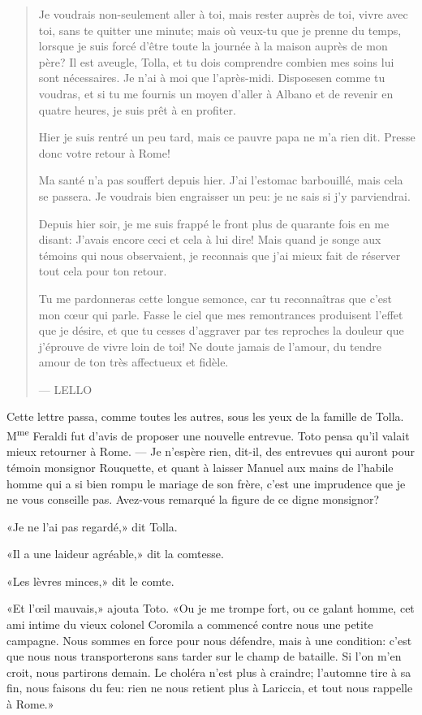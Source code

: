 \begin{quote}
Je voudrais non-seulement aller à toi, mais rester auprès de toi, vivre
avec toi, sans te quitter une minute; mais où veux-tu que je prenne du
temps, lorsque je suis forcé d'être toute la journée à la maison auprès
de mon père? Il est aveugle, Tolla, et tu dois comprendre combien mes
soins lui sont nécessaires. Je n'ai à moi que l'après-midi. Disposesen
comme tu voudras, et si tu me fournis un moyen d'aller à Albano et de
revenir en quatre heures, je suis prêt à en profiter.

Hier je suis rentré un peu tard, mais ce pauvre papa ne m'a rien dit.
Presse donc votre retour à Rome!

Ma santé n'a pas souffert depuis hier. J'ai l'estomac barbouillé, mais
cela se passera. Je voudrais bien engraisser un peu: je ne sais si j'y
parviendrai.

Depuis hier soir, je me suis frappé le front plus de quarante fois en me
disant: J'avais encore ceci et cela à lui dire! Mais quand je songe aux
témoins qui nous observaient, je reconnais que j'ai mieux fait de
réserver tout cela pour ton retour.

Tu me pardonneras cette longue semonce, car tu reconnaîtras que c'est
mon cœur qui parle. Fasse le ciel que mes remontrances produisent
l'effet que je désire, et que tu cesses d'aggraver par tes reproches la
douleur que j'éprouve de vivre loin de toi! Ne doute jamais de l'amour,
du tendre amour de ton très affectueux et fidèle.

--- LELLO
\end{quote}

Cette lettre passa, comme toutes les autres, sous les yeux de la famille
de Tolla. M\textsuperscript{me} Feraldi fut d'avis de proposer une
nouvelle entrevue. Toto pensa qu'il valait mieux retourner à Rome. ---
Je n'espère rien, dit-il, des entrevues qui auront pour témoin monsignor
Rouquette, et quant à laisser Manuel aux mains de l'habile homme qui a
si bien rompu le mariage de son frère, c'est une imprudence que je ne
vous conseille pas. Avez-vous remarqué la figure de ce digne monsignor?

«Je ne l'ai pas regardé,» dit Tolla.

«Il a une laideur agréable,» dit la comtesse.

«Les lèvres minces,» dit le comte.

«Et l'œil mauvais,» ajouta Toto. «Ou je me trompe fort, ou ce galant
homme, cet ami intime du vieux colonel Coromila a commencé contre nous
une petite campagne. Nous sommes en force pour nous défendre, mais à une
condition: c'est que nous nous transporterons sans tarder sur le champ
de bataille. Si l'on m'en croit, nous partirons demain. Le choléra n'est
plus à craindre; l'automne tire à sa fin, nous faisons du feu: rien ne
nous retient plus à Lariccia, et tout nous rappelle à Rome.»

